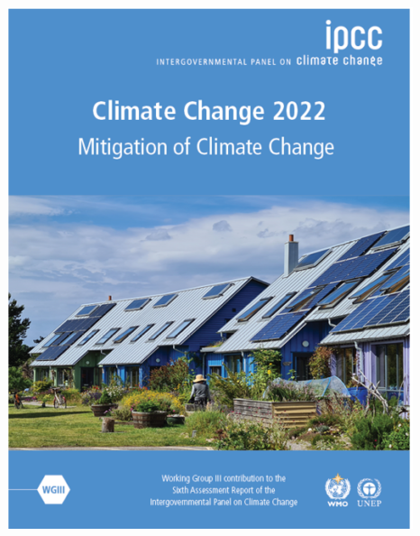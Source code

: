 \documentclass{beamer}
\begin{document}
\begin{frame}
\begin{columns}
\begin{column}{0.2\textwidth}
  \includegraphics[scale=0.126]{images/IPCC_AR6_WGIII.png}
\end{column}
\end{columns}

\
\end{frame}
\end{document}
